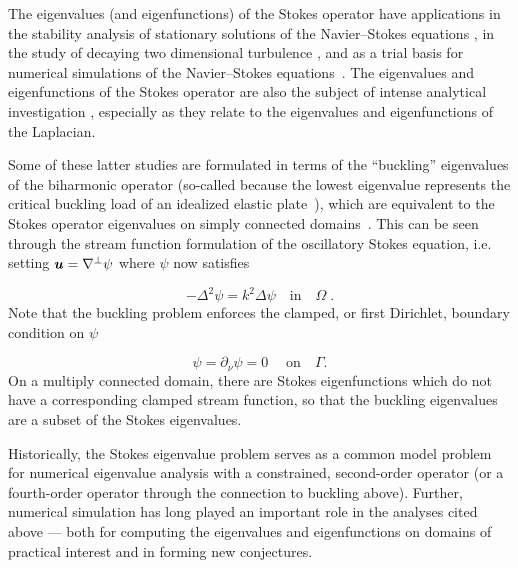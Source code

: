 The eigenvalues (and eigenfunctions)
of the Stokes operator have applications in the
stability analysis of stationary solutions of the
Navier--Stokes equations \cite{osborn1976approximation},
in the study of decaying two dimensional turbulence
\cite{schneider2008final}, and as a trial basis for
numerical simulations of the Navier--Stokes
equations~\cite{batcho1994generalized}.
%
The eigenvalues and eigenfunctions of the Stokes
operator are also the subject of intense analytical
investigation
\cite{taylor1933buckling,szego1950membranes,polya1951isoperimetric,bramble1963pointwise,ashbaugh1996fundamental,leriche2004stokes,kelliher2009eigenvalues,antunes2011buckling},
especially as they relate to the eigenvalues and
eigenfunctions of the Laplacian.
{\color{red} Some of these latter studies are
  formulated in terms of the ``buckling''
  eigenvalues of the biharmonic operator (so-called
  because the lowest eigenvalue represents the
  critical buckling load of an idealized
  elastic plate~\cite{taylor1933buckling,szego1950membranes,polya1951isoperimetric}),
  which are equivalent to the Stokes operator eigenvalues on simply
  connected domains~\cite{kelliher2009eigenvalues}.
%
  This can be seen through the stream function
  formulation  of the oscillatory Stokes
  equation, i.e. setting ${\boldsymbol u} = \nabla^\perp \psi$
  where $\psi$ now satisfies
  
  \begin{equation*}
    -\Delta^2 \psi = k^2 \Delta \psi \quad \textrm{in} \quad \Omega\; .
  \end{equation*}
  Note that the buckling problem enforces the
  clamped, or first Dirichlet, boundary
  condition on $\psi$

  \begin{equation*}
    \psi = \partial_\nu \psi = 0 \; \quad \textrm{on} \quad \Gamma.
  \end{equation*}
  On a multiply connected domain, there are
  Stokes eigenfunctions which do not have a corresponding
  clamped stream function, so that the
  buckling eigenvalues are a subset of the Stokes
  eigenvalues.}

Historically, the Stokes eigenvalue problem serves as a
common model problem for numerical eigenvalue analysis
with a {\color{red} constrained, second-order operator (or a
fourth-order operator through the connection to buckling
above).}
%
Further, numerical simulation has long played an
important role in the analyses cited above --- both for
computing the eigenvalues and eigenfunctions
on domains of practical interest and in forming
new conjectures.

